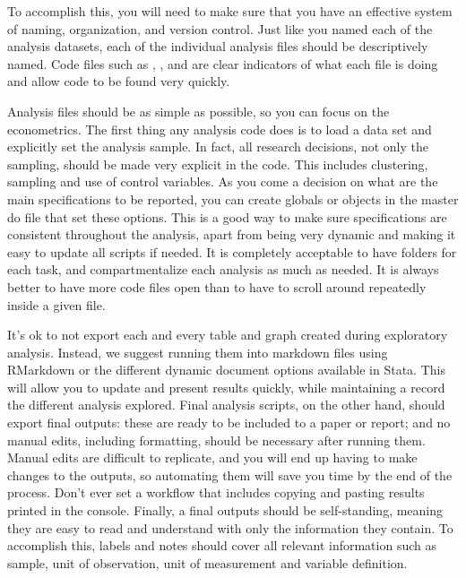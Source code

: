 To accomplish this, you will need to make sure that you
have an effective system of naming, organization, and version control.
Just like you named each of the analysis datasets,
each of the individual analysis files should be descriptively named.
Code files such as ,
, and 
are clear indicators of what each file is doing
and allow code to be found very quickly.

Analysis files should be as simple as possible, 
so you can focus on the econometrics.
The first thing any analysis code does is to load a data set
and explicitly set the analysis sample.
In fact, all research decisions, not only the sampling,
should be made very explicit in the code.
This includes clustering, sampling and use of control variables. 
As you come a decision on what are the main specifications to be reported,
you can create globals or objects in the master do file 
that set these options.
This is a good way to make sure specifications are consistent throughout the analysis, 
apart from being very dynamic and making it easy to update all scripts if needed.
It is completely acceptable to have folders for each task,
and compartmentalize each analysis as much as needed.
It is always better to have more code files open
than to have to scroll around repeatedly inside a given file.


It's ok to not export each and every table and graph created during exploratory analysis. 
Instead, we suggest running them into markdown files using RMarkdown or 
the different dynamic document options available in Stata. 
This will allow you to update and present results quickly, 
while maintaining a record the different analysis explored. 
Final analysis scripts, on the other hand, should export final outputs: 
these are ready to be included to a paper or report; and
no manual edits, including formatting, should be necessary after running them. 
Manual edits are difficult to replicate, 
and you will end up having to make changes to the outputs,
so automating them will save you time by the end of the process. 
Don't ever set a workflow that includes copying and pasting results printed in the console.
Finally, a final outputs should be self-standing,
meaning they are easy to read and understand 
with only the information they contain.
To accomplish this, labels and notes should cover all 
relevant information such as
sample, unit of observation, unit of measurement and variable definition. 

